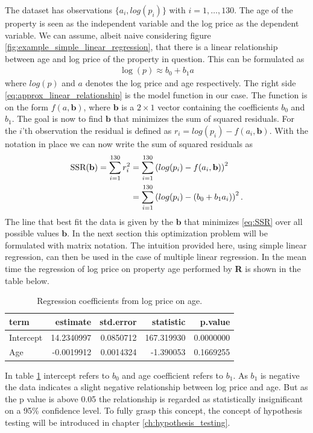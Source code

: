 The dataset has observations $\{a_i, log(p_i)\}$ with $i = 1, \ldots, 130$. 
The age of the property is seen as the independent variable and the log price as the dependent variable.
We can assume, albeit naive considering figure \ref{fig:example_simple_linear_regression}, that there is a linear relationship between age and log price of the property in question.
This can be formulated as
\begin{align}\label{eq:approx_linear_relationship}
    \log(p) \approx b_0 + b_1 a
\end{align}
where $log(p)$ and $a$ denotes the log price and age respectively.
The right side \eqref{eq:approx_linear_relationship} is the model function in our case.
The function is on the form $f(a, \textbf{b})$, where $\textbf{b}$ is a $2 \times 1$ vector containing the coefficients $b_0$ and $b_1$.
The goal is now to find $\textbf{b}$ that minimizes the sum of squared residuals.
For the $i$'th observation the residual is defined as $r_i = log(p_i) - f(a_i, \textbf{b})$.
With the notation in place we can now write the sum of squared residuals as
\begin{align}
  \operatorname{\text{SSR}}(\textbf{b}) = \sum_{i = 1}^{130} r_i^2 &= \sum_{i = 1}^{130} \left( log(p_i) - f(a_i, \textbf{b}) \right)^2 \nonumber\\
  &= \sum_{i = 1}^{130} \left( log(p_i) - (b_0 + b_1 a_i) \right)^2.\label{eq:SSR}
\end{align}
The line that best fit the data is given by the $\textbf{b}$ that minimizes \eqref{eq:SSR} over all possible values $\textbf{b}$.
In the next section this optimization problem will be formulated with matrix notation.
The intuition provided here, using simple linear regression, can then be used in the case of multiple linear regression.
In the mean time the regression of log price on property age performed by \textbf{R} is shown in the table below.
\begin{table}[H]
    \centering
    \begin{tabular}{lrrrr}
        \toprule
        \textbf{term} & \textbf{estimate} & \textbf{std.error} & \textbf{statistic} & \textbf{p.value}\\
        \midrule
        Intercept & 14.2340997 & 0.0850712 & 167.319930 & 0.0000000\\
        Age & -0.0019912 & 0.0014324 & -1.390053 & 0.1669255\\
        \bottomrule
    \end{tabular}
    \caption{Regression coefficients from log price on age.}
    \label{tab:regress_log_price_on_age}
\end{table}
In table \ref{tab:regress_log_price_on_age} intercept refers to $b_0$ and age coefficient refers to $b_1$.
As $b_1$ is negative the data indicates a slight negative relationship between log price and age.
But as the p value is above 0.05 the relationship is regarded as statistically insignificant on a 95\% confidence level.
To fully grasp this concept, the concept of hypothesis testing will be introduced in chapter \ref{ch:hypothesis_testing}.

